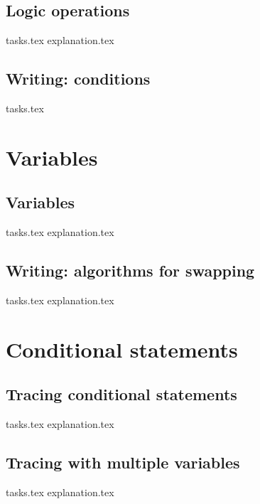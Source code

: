     \section{Logic operations}
    {tasks.tex}        \newpage
    {explanation.tex}     \newpage

    \section{Writing: conditions}
    {tasks.tex}           \newpage

    \chapter{Variables}
    \newpage

    \section{Variables}
    {tasks.tex}         \newpage
    {explanation.tex}      \newpage

    \section{Writing: algorithms for swapping}
    {tasks.tex}                 \newpage
    {explanation.tex}           \newpage

    \chapter{Conditional statements}
    \newpage

    \section{Tracing conditional statements}
    {tasks.tex}        \newpage
    {explanation.tex}     \newpage

    \section{Tracing with multiple variables}
    {tasks.tex}         \newpage
    {explanation.tex}      \newpage

